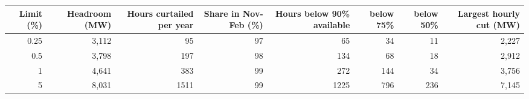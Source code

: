 \begin{tabular}{rrrrrrrr}
\toprule
Limit (\%) & Headroom (MW) & Hours curtailed per year & Share in Nov-Feb (\%) & Hours below 90\% available & below 75\% & below 50\% & Largest hourly cut (MW) \\
\midrule
0.25 & 3,112 & 95 & 97 & 65 & 34 & 11 & 2,227 \\
0.5 & 3,798 & 197 & 98 & 134 & 68 & 18 & 2,912 \\
1 & 4,641 & 383 & 99 & 272 & 144 & 34 & 3,756 \\
5 & 8,031 & 1511 & 99 & 1225 & 796 & 236 & 7,145 \\
\bottomrule
\end{tabular}